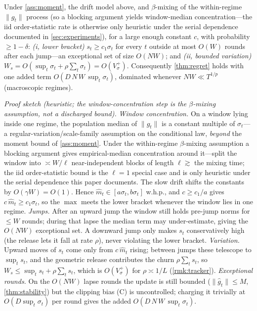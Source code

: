 \documentclass{article}
\newcommand{\norm}[1]{\lVert #1 \rVert}
\newcommand{\gt}{g_t}
\begin{document}
\begin{proposition}
\label{prop:tracker}
Under \cref{ass:moment}, the drift model above, and $\beta$-mixing of the within-regime
$\norm{\gt}$ process (so a blocking argument yields window-median concentration---the iid
order-statistic rate is otherwise only heuristic under the serial dependence documented in
\cref{sec:experiments}), for a large enough constant $c$, with probability $\ge1-\delta$:
\emph{(i, lower bracket)} $s_t\ge c_1\sigma_t$ for every $t$ outside at most $O(W)$
rounds after each jump---an exceptional set of size $O(NW)$; and
\emph{(ii, bounded variation)} $W_s=O(\sup_t\sigma_t+\rho\sum_t\sigma_t)=O(V_\sigma^+)$.
Consequently \cref{thm:regret} holds with one added term $O(D\,N\,W\,\sup_t\sigma_t)$,
dominated whenever $NW\ll T^{1/p}$ (macroscopic regimes).
\end{proposition}

\medskip\noindent\textit{Proof sketch (heuristic; the window-concentration step is the
$\beta$-mixing assumption, not a discharged bound).}
\emph{Window concentration.} On a window lying inside one regime, the population median
of $\norm{\gt}$ is a constant multiple of $\sigma_t$---a regular-variation/scale-family
assumption on the conditional law, \emph{beyond} the moment bound of \cref{ass:moment}. Under the
within-regime $\beta$-mixing assumption a blocking argument gives empirical-median
concentration around it---split the window into $\asymp W/\ell$ near-independent blocks of
length $\ell\gtrsim$ the mixing time; the iid order-statistic bound is the $\ell{=}1$
special case and is only heuristic under the serial dependence this paper documents. The
slow drift shifts the constants by $O(\gamma W)=O(1)$. Hence
$\widehat m_t\in[a\sigma_t,b\sigma_t]$ w.h.p., and $c\ge c_1/a$ gives
$c\,\widehat m_t\ge c_1\sigma_t$, so the $\max$ meets the lower bracket whenever the
window lies in one regime.
\emph{Jumps.} After an upward jump the window still holds pre-jump norms for $\le W$
rounds; during that lapse the median term may under-estimate, giving the $O(NW)$
exceptional set. A downward jump only makes $s_t$ conservatively high (the release lets
it fall at rate $\rho$), never violating the lower bracket.
\emph{Variation.} Upward moves of $s_t$ come only from $c\,\widehat m_t$ rising; between
jumps these telescope to $\sup_t s_t$, and the geometric release contributes the churn
$\rho\sum_t s_t$, so $W_s\le\sup_t s_t+\rho\sum_t s_t$, which is $O(V_\sigma^+)$ for
$\rho\asymp1/L$ (\cref{rmk:tracker}).
\emph{Exceptional rounds.} On the $O(NW)$ lapse rounds the update is still bounded
($\norm{\hat g_t}\le M$, \cref{thm:stability}) but the clipping bias (C) is uncontrolled;
charging it trivially at $O(D\sup_t\sigma_t)$ per round gives the added
$O(D\,N\,W\,\sup_t\sigma_t)$.\medskip
\end{document}
